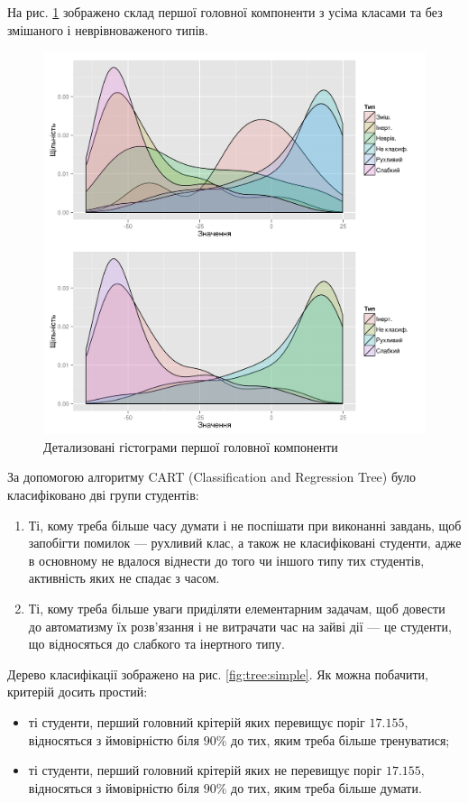 На рис. \ref{fig:pca1} зображено склад першої головної компоненти
з усіма класами та без змішаного і неврівноваженого типів.
\begin{figure}[h]
  \centering
    \includegraphics[width=\textwidth]{images/pca1_hist}
  \caption{Детализовані гістограми першої головної компоненти}
  \label{fig:pca1}
\end{figure}
За допомогою алгоритму CART (Classification and Regression Tree) було
класифіковано дві групи студентів:
\begin{enumerate}
  \item
    Ті, кому треба більше часу думати і не поспішати при виконанні завдань,
    щоб запобігти помилок --- рухливий клас, а також не класифіковані
    студенти, адже в основному не вдалося віднести до того чи іншого типу
    тих студентів, активність яких не спадає з часом.
  \item
    Ті, кому треба більше уваги приділяти елементарним задачам,
    щоб довести до автоматизму їх розв’язання і не витрачати час на
    зайві дії --- це студенти, що відносяться до слабкого та інертного типу.
\end{enumerate}
Дерево класифікації зображено на рис. \ref{fig:tree:simple}.
Як можна побачити, критерій досить простий:
\begin{itemize}
  \item
    ті студенти, перший головний крітерій яких перевищує поріг $17.155$,
    відносяться з ймовірністю біля $90\%$ до тих, яким треба більше
    тренуватися;
  \item
    ті студенти, перший головний крітерій яких не перевищує поріг $17.155$,
    відносяться з ймовірністю біля $90\%$ до тих, яким треба більше думати.
\end{itemize}
